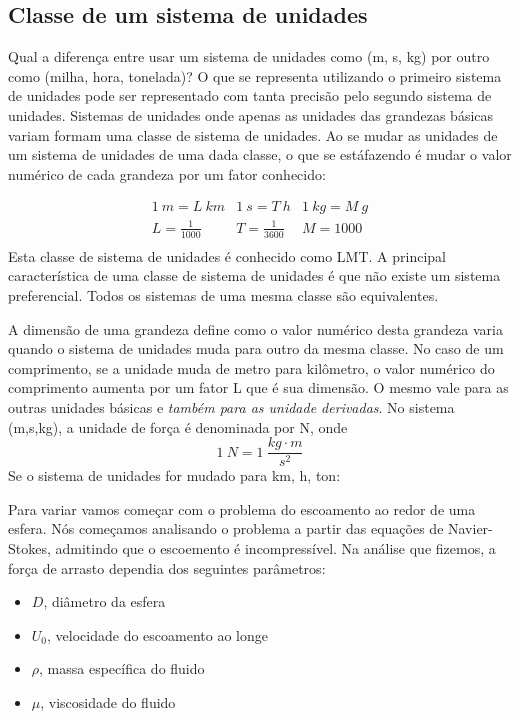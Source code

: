 \subsection{Classe de um sistema de unidades}

Qual a diferença entre usar um sistema de unidades como (m, s, kg) por outro como (milha, hora, tonelada)? O que se representa utilizando o primeiro sistema de unidades pode ser representado com tanta precisão pelo segundo sistema de unidades. Sistemas de unidades onde apenas as unidades das grandezas básicas variam formam uma classe de sistema de unidades. Ao se mudar as unidades de um sistema de unidades de uma dada classe, o que se estáfazendo é mudar o valor numérico de cada grandeza por um fator conhecido:

\[
\begin{matrix}
  1\:m = L\:km & 1\:s = T\:h & 1\:kg = M\:g\\
  L=\frac{1}{1000} & T = \frac{1}{3600} & M = 1000\\
\end{matrix}
\]
Esta classe de sistema de unidades é conhecido como LMT. A principal característica de uma classe de sistema de unidades é que não existe um sistema preferencial. Todos os sistemas de uma mesma classe são equivalentes.

A dimensão de uma grandeza define como o valor numérico desta grandeza varia quando o sistema de unidades muda para outro da mesma classe. No caso de um comprimento, se a unidade muda de metro para kilômetro, o valor numérico do comprimento aumenta por um fator L que é sua dimensão. O mesmo vale para as outras unidades básicas e \emph{também para as unidade derivadas}. No sistema (m,s,kg), a unidade de força é denominada por N, onde
\[
1\:N = 1\:\frac{kg\cdot m}{s^2}
\]
Se o sistema de unidades for mudado para km, h, ton: 





Para variar vamos começar com o problema do escoamento ao redor de uma esfera. Nós começamos analisando o problema a partir das equações de Navier-Stokes, admitindo que o escoemento é incompressível. Na análise que fizemos, a força de arrasto dependia dos seguintes parâmetros:
\begin{itemize}
\item $D$, diâmetro da esfera
\item $U_0$, velocidade do escoamento ao longe
\item $\rho$, massa específica do fluido
\item $\mu$, viscosidade do fluido
\end{itemize}

